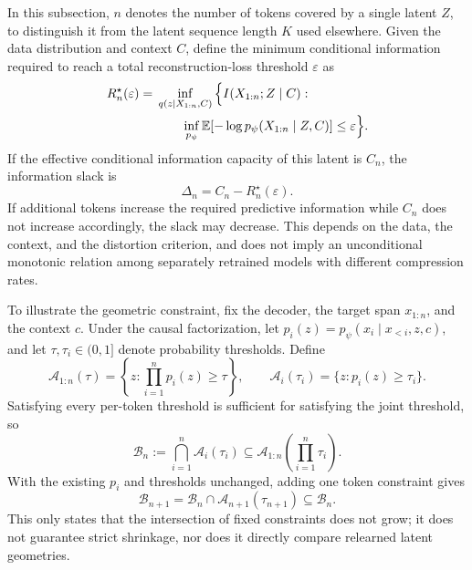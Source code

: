 In this subsection, $n$ denotes the number of tokens covered by a single latent $Z$, to distinguish it from the latent sequence length $K$ used elsewhere. Given the data distribution and context $C$, define the minimum conditional information required to reach a total reconstruction-loss threshold $\varepsilon$ as
\begin{equation}
\begin{aligned}
    R_n^\star(\varepsilon)
    ={}&\inf_{q(z\mid X_{1:n},C)}
    \Big\{I(X_{1:n};Z\mid C):\\
       &\qquad\inf_{p_\psi}
    \mathbb{E}[-\log p_\psi(X_{1:n}\mid Z,C)]\le\varepsilon\Big\}.
\end{aligned}
\label{eq:app-required-info}
\end{equation}
If the effective conditional information capacity of this latent is $C_n$, the information slack is
\begin{equation}
    \Delta_n=C_n-R_n^\star(\varepsilon).
    \label{eq:app-compression-slack}
\end{equation}
If additional tokens increase the required predictive information while $C_n$ does not increase accordingly, the slack may decrease. This depends on the data, the context, and the distortion criterion, and does not imply an unconditional monotonic relation among separately retrained models with different compression rates.

To illustrate the geometric constraint, fix the decoder, the target span $x_{1:n}$, and the context $c$. Under the causal factorization, let $p_i(z)=p_\psi(x_i\mid x_{<i},z,c)$, and let $\tau,\tau_i\in(0,1]$ denote probability thresholds. Define
\begin{equation}
    \mathcal A_{1:n}(\tau)
    =\left\{z:\prod_{i=1}^{n}p_i(z)\ge\tau\right\},
    \qquad
    \mathcal A_i(\tau_i)=\{z:p_i(z)\ge\tau_i\}.
    \label{eq:app-valid-region}
\end{equation}
Satisfying every per-token threshold is sufficient for satisfying the joint threshold, so
\begin{equation}
    \mathcal B_n:=\bigcap_{i=1}^{n}\mathcal A_i(\tau_i)
    \subseteq
    \mathcal A_{1:n}\!\left(\prod_{i=1}^{n}\tau_i\right).
    \label{eq:app-valid-intersection}
\end{equation}
With the existing $p_i$ and thresholds unchanged, adding one token constraint gives
\begin{equation}
    \mathcal B_{n+1}
    =\mathcal B_n\cap\mathcal A_{n+1}(\tau_{n+1})
    \subseteq\mathcal B_n.
    \label{eq:app-valid-nesting}
\end{equation}
This only states that the intersection of fixed constraints does not grow; it does not guarantee strict shrinkage, nor does it directly compare relearned latent geometries.

